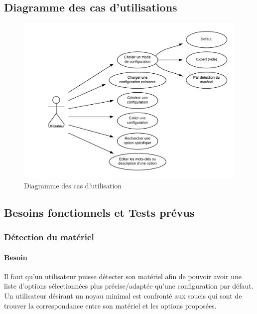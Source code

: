 \documentclass[16pts]{report}
\begin{document}
        \subsection{Diagramme des cas d'utilisations}
        \label{sub:Diagramme des cas d'utilisations}

\begin{figure}[H]
    \includegraphics[scale=0.25]{illustrations/diagramme_cas_utilisation.png}
    \centering
    \caption{Diagramme des cas d'utilisation}
    \label{fig:DCU}
\end{figure}

        \subsection{Besoins fonctionnels et Tests prévus}
        \label{sub:Besoins fonctionnels et Tests prévus}

\subsubsection{Détection du matériel}
\label{ssub:Détection du matériel}
\paragraph{Besoin}
\label{sssbus:Besoin}

Il faut qu’un utilisateur puisse détecter son matériel afin de pouvoir
avoir une liste d’options sélectionnées plus précise/adaptée qu’une
configuration par défaut. Un utilisateur désirant un noyau minimal est
confronté aux soucis qui sont de trouver la correspondance entre son matériel et
les options proposées.
\\
\end{document}
